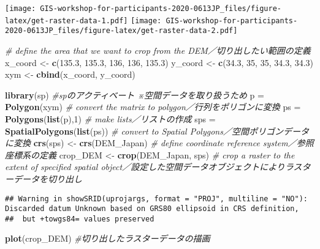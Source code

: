 \documentclass[
  xelatex,ja=standard]{bxjsarticle}
\newenvironment{Shaded}{\begin{snugshade}}{\end{snugshade}}
\newcommand{\CommentTok}[1]{\textcolor[rgb]{0.56,0.35,0.01}{\textit{#1}}}
\newcommand{\DecValTok}[1]{\textcolor[rgb]{0.00,0.00,0.81}{#1}}
\newcommand{\FloatTok}[1]{\textcolor[rgb]{0.00,0.00,0.81}{#1}}
\newcommand{\KeywordTok}[1]{\textcolor[rgb]{0.13,0.29,0.53}{\textbf{#1}}}
\newcommand{\NormalTok}[1]{#1}
\newcommand{\StringTok}[1]{\textcolor[rgb]{0.31,0.60,0.02}{#1}}
\begin{document}
\texttt{[image: GIS-workshop-for-participants-2020-0613JP\_files/figure-latex/get-raster-data-1.pdf]}
\texttt{[image: GIS-workshop-for-participants-2020-0613JP\_files/figure-latex/get-raster-data-2.pdf]}

\begin{Shaded}
\begin{Highlighting}[]
\CommentTok{# define the area that we want to crop from the DEM／切り出したい範囲の定義  }
\NormalTok{x_coord <-}\StringTok{ }\KeywordTok{c}\NormalTok{(}\FloatTok{135.3}\NormalTok{, }\FloatTok{135.3}\NormalTok{, }\DecValTok{136}\NormalTok{, }\DecValTok{136}\NormalTok{, }\FloatTok{135.3}\NormalTok{)}
\NormalTok{y_coord <-}\StringTok{ }\KeywordTok{c}\NormalTok{(}\FloatTok{34.3}\NormalTok{, }\DecValTok{35}\NormalTok{, }\DecValTok{35}\NormalTok{, }\FloatTok{34.3}\NormalTok{, }\FloatTok{34.3}\NormalTok{)}
\NormalTok{xym <-}\StringTok{ }\KeywordTok{cbind}\NormalTok{(x_coord, y_coord)}

\KeywordTok{library}\NormalTok{(sp) }\CommentTok{#spのアクティベート ※空間データを取り扱うため  }
\NormalTok{p =}\StringTok{ }\KeywordTok{Polygon}\NormalTok{(xym) }\CommentTok{# convert the matrix to polygon／行列をポリゴンに変換  }
\NormalTok{ps =}\StringTok{ }\KeywordTok{Polygons}\NormalTok{(}\KeywordTok{list}\NormalTok{(p),}\DecValTok{1}\NormalTok{) }\CommentTok{# make lists／リストの作成  }
\NormalTok{sps =}\StringTok{ }\KeywordTok{SpatialPolygons}\NormalTok{(}\KeywordTok{list}\NormalTok{(ps)) }\CommentTok{# convert to Spatial Polygons／空間ポリゴンデータに変換  }
\KeywordTok{crs}\NormalTok{(sps) <-}\StringTok{ }\KeywordTok{crs}\NormalTok{(DEM_Japan) }\CommentTok{# define coordinate reference system／参照座標系の定義  }
\NormalTok{crop_DEM <-}\StringTok{ }\KeywordTok{crop}\NormalTok{(DEM_Japan, sps) }\CommentTok{# crop a raster to the extent of specified spatial object／設定した空間データオブジェクトによりラスターデータを切り出し  }
\end{Highlighting}
\end{Shaded}

\begin{verbatim}
## Warning in showSRID(uprojargs, format = "PROJ", multiline = "NO"): Discarded datum Unknown based on GRS80 ellipsoid in CRS definition,
##  but +towgs84= values preserved
\end{verbatim}

\begin{Shaded}
\begin{Highlighting}[]
\KeywordTok{plot}\NormalTok{(crop_DEM) }\CommentTok{#切り出したラスターデータの描画  }
\end{Highlighting}
\end{Shaded}
\end{document}
